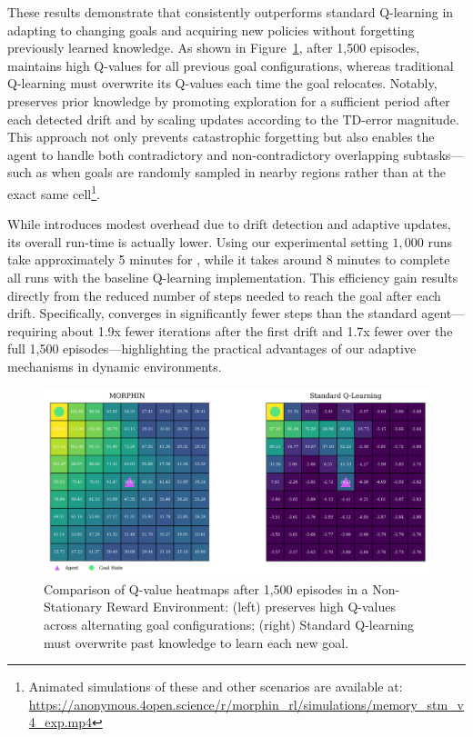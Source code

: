 These results demonstrate that \adaptiverl consistently outperforms standard Q-learning in adapting to changing goals and acquiring new policies without forgetting previously learned knowledge. As shown in Figure~\ref{fig:q-value-comp}, after 1,500 episodes, \adaptiverl maintains high Q-values for all previous goal configurations, whereas traditional Q-learning must overwrite its Q-values each time the goal relocates. Notably, \adaptiverl preserves prior knowledge by promoting exploration for a sufficient period after each detected drift and by scaling updates according to the TD-error magnitude. This approach not only prevents catastrophic forgetting but also enables the agent to handle both contradictory and non-contradictory overlapping subtasks---such as when goals are randomly sampled in nearby regions rather than at the exact same cell\footnote{Animated simulations of these and other scenarios are available at: \url{https://anonymous.4open.science/r/morphin_rl/simulations/memory_stm_v4_exp.mp4}}.

While \adaptiverl introduces modest overhead due to drift detection and adaptive updates, its overall 
run-time is actually lower. Using our experimental setting $1,000$ runs take approximately 5
minutes for \adaptiverl, while it takes around 8 minutes to complete all runs with the baseline Q-learning implementation. This efficiency gain results directly from the reduced number of steps needed to reach the goal after each drift. Specifically, \adaptiverl converges in significantly fewer steps than the standard agent---requiring about 1.9x fewer iterations after the first drift and 1.7x fewer over the full 1,500 episodes---highlighting the practical advantages of our adaptive mechanisms in dynamic environments.

\begin{figure}
    \centering
    \includegraphics[width=\textwidth]{figures/q_map_comp}
    \caption{Comparison of Q-value heatmaps after 1,500 episodes in a Non-Stationary Reward Environment: (left) \adaptiverl preserves high Q-values across alternating goal configurations; (right) Standard Q-learning must overwrite past knowledge to learn each new goal.}
    \label{fig:q-value-comp}
\end{figure}

